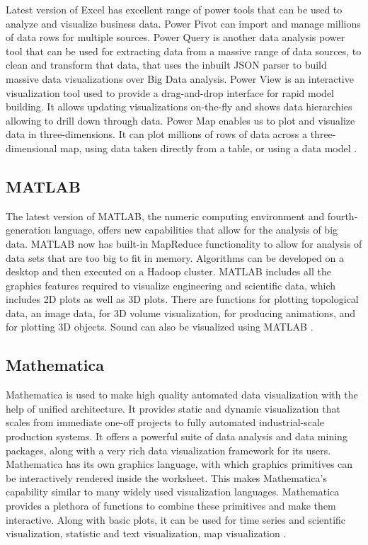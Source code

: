 Latest version of Excel has excellent range of power tools that can be used to analyze and visualize business data. Power Pivot can import and manage millions of data rows for multiple sources. Power Query is another data analysis power tool that can be used for extracting data from a massive range of data sources, to clean and transform that data, that uses the inbuilt JSON parser to build massive data visualizations over Big Data analysis. Power View is an interactive visualization tool used to provide a drag-and-drop interface for rapid model building. It allows updating visualizations on-the-fly and shows data hierarchies allowing to drill down through data. Power Map enables us to plot and visualize data in  three-dimensions. It can plot millions of rows of data across a three-dimensional map, using data taken directly from a table, or using a data model \cite{Excel}.

\subsection*{MATLAB}

The latest version of MATLAB, the numeric computing environment and fourth-generation language, offers new capabilities that allow for the analysis of big data. MATLAB now has built-in MapReduce functionality to allow for analysis of data sets that are too big to fit in memory. Algorithms can be developed on a desktop and then executed on a Hadoop cluster. MATLAB includes all the graphics features required to visualize engineering and scientific data, which includes 2D plots as well as 3D plots. There are functions for plotting topological data, an image data, for 3D volume visualization, for producing animations, and for plotting 3D objects. Sound can also be visualized using MATLAB \cite{MATLAB}.

\subsection*{Mathematica}

Mathematica is used to make high quality automated data visualization with the help of unified architecture. It provides static and dynamic visualization that scales from immediate one-off projects to fully automated industrial-scale production systems. It	offers a powerful suite	of data	analysis and data mining packages, along with a	very rich data visualization framework for its users. Mathematica has its own graphics language,	with which graphics	primitives can be interactively	rendered inside	the	worksheet. This makes Mathematica’s	capability similar to many widely used visualization languages.	Mathematica	provides a plethora	of functions to	combine	these primitives and make them interactive. Along with basic plots, it can be used for time series and scientific visualization, statistic and text visualization, map visualization \cite{Mathematica}.\\

